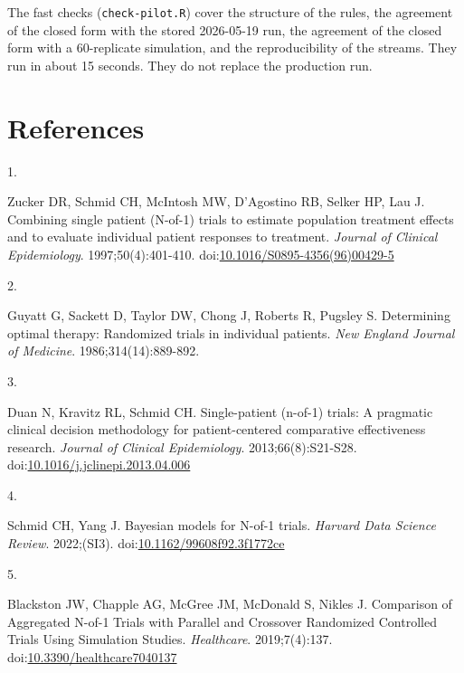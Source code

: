 \documentclass[
  11pt,
]{article}
\newlength{\cslhangindent}
\newlength{\csllabelwidth}
\newenvironment{CSLReferences}[2] %
 {\begin{list}{}{%
  \setlength{\itemindent}{0pt}
  \setlength{\leftmargin}{0pt}
  \setlength{\parsep}{0pt}
  \ifodd #1
   \setlength{\leftmargin}{\cslhangindent}
   \setlength{\itemindent}{-1\cslhangindent}
  \fi
  \setlength{\itemsep}{#2\baselineskip}}}
 {\end{list}}
\newcommand{\CSLLeftMargin}[1]{\parbox[t]{\csllabelwidth}{\strut#1\strut}}
\newcommand{\CSLRightInline}[1]{\parbox[t]{\linewidth - \csllabelwidth}{\strut#1\strut}}
\begin{document}
The fast checks (\texttt{check-pilot.R}) cover the structure of the rules, the agreement of the closed form with the stored 2026-05-19 run, the agreement of the closed form with a 60-replicate simulation, and the reproducibility of the streams. They run in about 15 seconds. They do not replace the production run.

\section{References}\label{references}

\protect{}\label{refs}
\begin{CSLReferences}{0}{1}
\CSLLeftMargin{1. }%
\CSLRightInline{Zucker DR, Schmid CH, McIntosh MW, D'Agostino RB, Selker HP, Lau J. Combining single patient ({N}-of-1) trials to estimate population treatment effects and to evaluate individual patient responses to treatment. \emph{Journal of Clinical Epidemiology}. 1997;50(4):401-410. doi:\href{https://doi.org/10.1016/S0895-4356(96)00429-5}{10.1016/S0895-4356(96)00429-5}}

\CSLLeftMargin{2. }%
\CSLRightInline{Guyatt G, Sackett D, Taylor DW, Chong J, Roberts R, Pugsley S. Determining optimal therapy: Randomized trials in individual patients. \emph{New England Journal of Medicine}. 1986;314(14):889-892.}

\CSLLeftMargin{3. }%
\CSLRightInline{Duan N, Kravitz RL, Schmid CH. Single-patient (n-of-1) trials: A pragmatic clinical decision methodology for patient-centered comparative effectiveness research. \emph{Journal of Clinical Epidemiology}. 2013;66(8):S21-S28. doi:\href{https://doi.org/10.1016/j.jclinepi.2013.04.006}{10.1016/j.jclinepi.2013.04.006}}

\CSLLeftMargin{4. }%
\CSLRightInline{Schmid CH, Yang J. Bayesian models for {N}-of-1 trials. \emph{Harvard Data Science Review}. 2022;(SI3). doi:\href{https://doi.org/10.1162/99608f92.3f1772ce}{10.1162/99608f92.3f1772ce}}

\CSLLeftMargin{5. }%
\CSLRightInline{Blackston JW, Chapple AG, McGree JM, McDonald S, Nikles J. Comparison of {Aggregated N-of-1 Trials} with {Parallel} and {Crossover Randomized Controlled Trials Using Simulation Studies}. \emph{Healthcare}. 2019;7(4):137. doi:\href{https://doi.org/10.3390/healthcare7040137}{10.3390/healthcare7040137}}


\end{CSLReferences}
\end{document}

